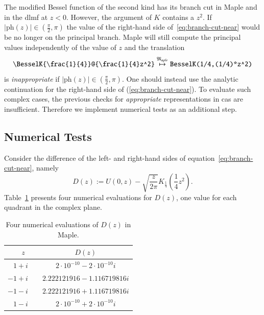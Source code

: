 \documentclass[a4paper,11pt]{article}
\newcommand{\Maple}{Maple}
\newcommand{\langMaple}{\mathfrak{M}_{aple}}
\newcommand{\tableRowSpace}{\rule{0pt}{0.9\normalbaselineskip}}
\theoremstyle{defTheoStyle}
\theoremstyle{defExampStyle}
\DeclareRobustCommand{\cpi}{{\pi}}
\DeclareRobustCommand{\iunit}{{i}}
\newcommand{\ph}[1]{\mathrm{ph}\!\left(#1\right)}
\begin{document}
	The modified Bessel function of the second kind has its branch cut in \Maple{} and in the \gls*{dlmf} at $z < 0$. However, the argument of $K$ contains a $z^2$. If $|\ph{z}| \in \left(\frac{\cpi}{2}, \cpi\right)$ the value of the right-hand side of~\eqref{eq:branch-cut-near} would be no longer on the principal branch. \Maple{} will still compute the principal values independently of the value of $z$ and the translation
	\begin{equation}
	\verb|\BesselK{\frac{1}{4}}@{\frac{1}{4}z^2}| \overset{\langMaple}{\mapsto} \verb|BesselK(1/4,(1/4)*z^2)|
	\end{equation}
	is {\it inappropriate} if $|\ph{z}| \in \left(\frac{\cpi}{2}, \cpi\right)$. One should instead use the analytic continuation for the right-hand side of (\ref{eq:branch-cut-near}). 
	To evaluate such complex cases, the previous checks for {\it appropriate} representations in \gls*{cas} are insufficient. Therefore we implement numerical tests as an additional step.
	
	\subsection{Numerical Tests}\label{sec:numerical-tests}
	Consider the difference of the left- and right-hand sides of equation~\eqref{eq:branch-cut-near}, namely
	\begin{equation}\label{eq:difference}
	D(z) := U(0,z) - \sqrt{\frac{z}{2\cpi}} K_{\frac{1}{4}}\left(\frac{1}{4}z^2\right).
	\end{equation}
	Table~\ref{tab:computations-for-difference} presents four numerical evaluations for $D(z)$, one value for each quadrant in the complex plane.
	\begin{table}[ht]
		\centering
		\begin{tabular}{rcc}
			\hline
			$z\ \ $ & & $D(z)$\\
			\hline
			\tableRowSpace{} $1+\iunit$ & & $2 \cdot 10^{-10} - 2 \cdot 10^{-10} \iunit$\\
			$-1+\iunit$& & $2.222121916 - 1.116719816 \iunit$\\
			$-1-\iunit$& & $2.222121916 + 1.116719816 \iunit$\\
			$1-\iunit$ & & $2 \cdot 10^{-10} + 2 \cdot 10^{-10} \iunit$\\
			\hline
		\end{tabular}
		\caption{Four numerical evaluations of $D(z)$ in \Maple.}
		\label{tab:computations-for-difference}
	\end{table}
	
\end{document}
